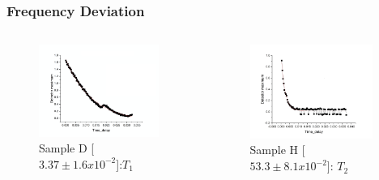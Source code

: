 \begin{frame}
    \frametitle{Frequency Deviation}
    \begin{columns}
            \column[t]{5cm}
            \begin{figure}
                    \begin{center}
                            \includegraphics[height=3cm]{./images/figures/theory/d-t1.png}
                    \end{center}
                            \caption{Sample D [$ 3.37 \pm 1.6 x 10^{-2}$]:$ T_1$}
                    \label{fig:d_t1}
            \end{figure}
            \column[t]{5cm}
            \begin{figure}[htbp!]
                    \begin{center}
                            \includegraphics[height=3.06cm]{./images/figures/t_plots_appendix/h_t2.jpg}
                    \end{center}
                            \caption{Sample H [$ 53.3 \pm 8.1 x 10^{-2}]$: $T_2$}
                    \label{fig:h_t2}
            \end{figure}
          \end{columns}
\end{frame}